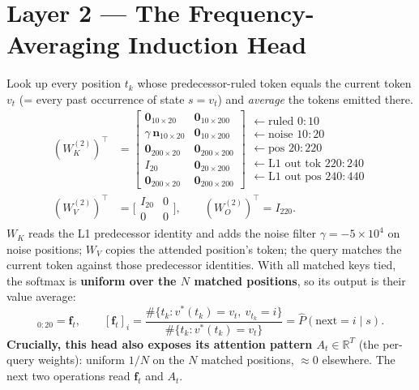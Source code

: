 \documentclass[11pt]{article}
\newcommand{\R}{\mathbb{R}}
\newcommand{\T}{^{\!\top}}
\newcommand{\fvec}{\mathbf{f}}
\newcommand{\zeros}{\mathbf{0}}
\newcommand{\vstar}{v^{*}}
\begin{document}
\section{Layer 2 --- The Frequency-Averaging Induction Head}
\label{sec:l2}
Look up every position $t_k$ whose predecessor-ruled token equals the current token $v_t$ (= every past
occurrence of state $s=v_t$) and \emph{average} the tokens emitted there.
\begin{align}
(W^{(2)}_K)\T &=
\begin{bmatrix}\zeros_{10\times20}&\zeros_{10\times200}\\ \gamma\,\mathbf{n}_{10\times20}&\zeros_{10\times200}\\
\zeros_{200\times20}&\zeros_{200\times200}\\ I_{20}&\zeros_{20\times200}\\ \zeros_{200\times20}&\zeros_{200\times200}\end{bmatrix}
\begin{array}{l}\scriptstyle\leftarrow\text{ruled }0{:}10\\\scriptstyle\leftarrow\text{noise }10{:}20\\\scriptstyle\leftarrow\text{pos }20{:}220\\\scriptstyle\leftarrow\text{L1 out tok }220{:}240\\\scriptstyle\leftarrow\text{L1 out pos }240{:}440\end{array}
\\[3pt]
(W^{(2)}_V)\T &=\Big[\begin{smallmatrix}I_{20}&0\\0&0\end{smallmatrix}\Big],\qquad (W^{(2)}_O)\T=I_{220}.
\end{align}
$W_K$ reads the L1 predecessor identity and adds the noise filter $\gamma=-5\times10^4$ on noise
positions; $W_V$ copies the attended position's token; the query matches the current token against those
predecessor identities. With all matched keys tied, the softmax is \textbf{uniform over the $N$ matched
positions}, so its output is their value average:
\begin{equation}
[a^{(2)}_t]_{0:20}=\fvec_t,\qquad
[\fvec_t]_i=\frac{\#\{t_k:\vstar(t_k)=v_t,\ v_{t_k}=i\}}{\#\{t_k:\vstar(t_k)=v_t\}}
=\widehat P(\text{next}=i\mid s).
\end{equation}
\textbf{Crucially, this head also exposes its attention pattern $A_t\in\R^{T}$} (the per-query weights):
uniform $1/N$ on the $N$ matched positions, $\approx 0$ elsewhere. The next two operations read $\fvec_t$
and $A_t$.
\end{document}
